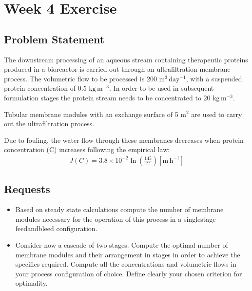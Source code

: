 \documentclass[letterpaper,10pt,english]{jupyterBook}
\begin{document}
\sphinxstepscope


\section{Week 4 \sphinxhyphen{} Exercise}
\label{\detokenize{Exercise_W4_2024_updated:week-4-exercise}}\label{\detokenize{Exercise_W4_2024_updated::doc}}

\subsection{Problem Statement}
\label{\detokenize{Exercise_W4_2024_updated:problem-statement}}
\sphinxAtStartPar
The downstream processing of an aqueous stream containing therapeutic proteins produced in a bioreactor is carried out through an ultrafiltration membrane process.
The volumetric flow to be processed is 200 \(\mathrm{m^3\,day^{-1}}\), with a suspended protein concentration of 0.5 \(\mathrm{kg\,m^{-3}}\).
In order to be used in subsequent formulation stages the protein stream needs to be concentrated to 20 \(\mathrm{kg\,m^{-3}}\).

\sphinxAtStartPar
Tubular membrane modules with an exchange surface of 5 \(\mathrm{m^2}\) are used to carry out the ultrafiltration process.

\sphinxAtStartPar
Due to fouling, the water flow through these membranes decreases when protein concentration (C) increases following the empirical law:
\begin{equation*}
\begin{split}
J(C)=3.8\times10^{-2}\ln\left(\frac{145}{C}\right) \mathrm{[m\,h^{-1}]}
\end{split}
\end{equation*}

\subsection{Requests}
\label{\detokenize{Exercise_W4_2024_updated:requests}}\begin{itemize}
\item {} 
\sphinxAtStartPar
Based on steady state calculations compute the number of membrane modules necessary for the operation of this process in a single\sphinxhyphen{}stage feed\sphinxhyphen{}and\sphinxhyphen{}bleed configuration.

\item {} 
\sphinxAtStartPar
Consider now a cascade of two stages. Compute the optimal number of membrane modules and their arrangement in stages in order to achieve the specifics required. Compute all the concentrations and volumetric flows in your process configuration of choice.  Define clearly your chosen criterion for optimality.

\end{itemize}
\end{document}
